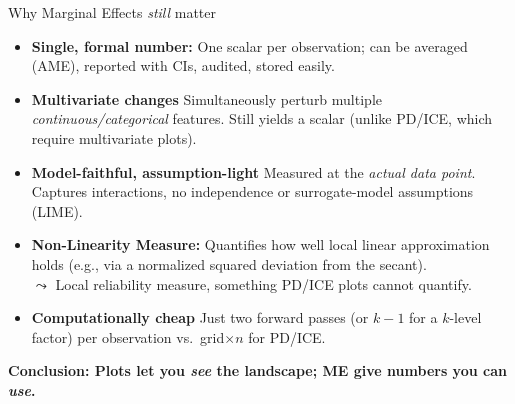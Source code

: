 \documentclass[10pt,compress,t,notes=noshow, xcolor=table]{beamer}
\begin{document}
\begin{frame}{Why Marginal Effects \emph{still} matter}

\begin{itemize}\setlength\itemsep{0.55em}
\item \textbf{Single, formal number:} One \alert{scalar} per observation; can be averaged (AME), reported with CIs, audited, stored easily.

\item \textbf{Multivariate changes}  
      Simultaneously perturb multiple \emph{continuous/categorical} features.
       Still yields a scalar (unlike PD/ICE, which require multivariate plots).

\item \textbf{Model-faithful, assumption-light}  
      Measured at the \emph{actual data point}.
      Captures interactions, no independence or surrogate-model assumptions (LIME).

\item \textbf{Non-Linearity Measure:}  
Quantifies how well local linear approximation holds (e.g., via a normalized squared deviation from the secant). \\
$\leadsto$ Local reliability measure, something PD/ICE plots cannot quantify.
\item \textbf{Computationally cheap}  
      Just two forward passes (or \(k\!-\!1\) for a \(k\)-level factor) per observation vs.\ grid\(\times n\) for PD/ICE.

\end{itemize}

\vspace{0.3em}
\begin{center}
\textbf{Conclusion: Plots let you \emph{see} the landscape;\quad  
ME give numbers you can \emph{use}.}
\end{center}

\end{frame}
\end{document}
